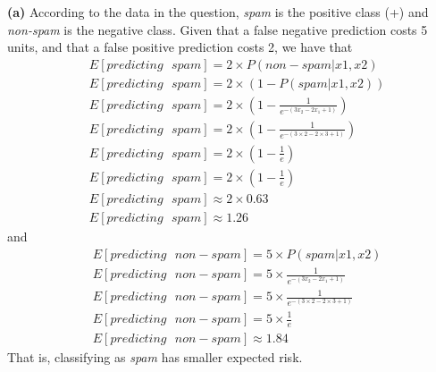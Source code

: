 \documentclass[leqno]{article}
\begin{document}
\noindent \textbf{(a)} According to the data in the question, \textit{spam} is the positive class (+) and \textit{non-spam} is the negative class. Given that a false negative 
prediction costs 5 units, and that a false positive prediction costs 2, we have that
\begin{equation*}
\begin{split}
&E[predicting\mbox{ }spam] = 2 \times P(non-spam|x1, x2)\\
&E[predicting\mbox{ }spam] = 2 \times (1 - P(spam|x1, x2))\\
&E[predicting\mbox{ }spam] = 2 \times (1 - \frac{1}{e^{-(3x_2 - 2x_1 + 1)}})\\
&E[predicting\mbox{ }spam] = 2 \times (1 - \frac{1}{e^{-(3 \times 2 - 2 \times 3 + 1)}})\\
&E[predicting\mbox{ }spam] = 2 \times (1 - \frac{1}{e})\\
&E[predicting\mbox{ }spam] = 2 \times (1 - \frac{1}{e})\\
&E[predicting\mbox{ }spam] \approx 2 \times 0.63\\
&E[predicting\mbox{ }spam] \approx 1.26
\end{split}
\end{equation*} 
and
\begin{equation*}
\begin{split}
&E[predicting\mbox{ }non-spam] = 5 \times P(spam|x1, x2)\\
&E[predicting\mbox{ }non-spam] = 5 \times \frac{1}{e^{-(3x_2 - 2x_1 + 1)}}\\
&E[predicting\mbox{ }non-spam] = 5 \times \frac{1}{e^{-(3 \times 2 - 2 \times 3 + 1)}}\\
&E[predicting\mbox{ }non-spam] = 5 \times \frac{1}{e}\\
&E[predicting\mbox{ }non-spam] \approx 1.84
\end{split}
\end{equation*} 
That is, classifying as \textit{spam} has smaller expected risk.
\end{document}
